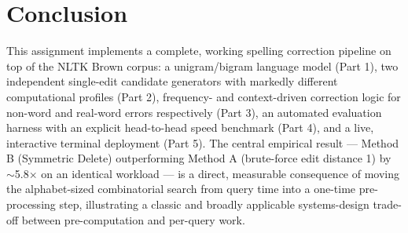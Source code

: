 \documentclass[11pt]{article}
\begin{document}
\section{Conclusion}

This assignment implements a complete, working spelling correction pipeline on top of the NLTK Brown corpus: a unigram/bigram language model (Part 1), two independent single-edit candidate generators with markedly different computational profiles (Part 2), frequency- and context-driven correction logic for non-word and real-word errors respectively (Part 3), an automated evaluation harness with an explicit head-to-head speed benchmark (Part 4), and a live, interactive terminal deployment (Part 5). The central empirical result --- Method B (Symmetric Delete) outperforming Method A (brute-force edit distance 1) by $\sim$5.8$\times$ on an identical workload --- is a direct, measurable consequence of moving the alphabet-sized combinatorial search from query time into a one-time pre-processing step, illustrating a classic and broadly applicable systems-design trade-off between pre-computation and per-query work.
\end{document}
